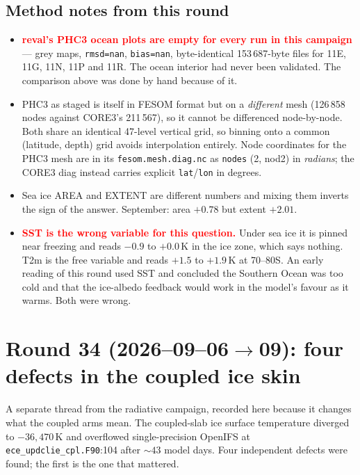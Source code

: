 \documentclass[10pt]{article}
\begin{document}
\subsection{Method notes from this round}\label{sub:r33method}

\begin{itemize}\itemsep1pt
\item \textcolor{red}{\textbf{reval's PHC3 ocean plots are empty for every run in this
campaign}} --- grey maps, \texttt{rmsd=nan}, \texttt{bias=nan}, byte-identical
153\,687-byte files for 11E, 11G, 11N, 11P and 11R. The ocean interior had never been
validated. The comparison above was done by hand because of it.
\item PHC3 as staged is itself in FESOM format but on a \emph{different} mesh (126\,858
nodes against CORE3's 211\,567), so it cannot be differenced node-by-node. Both share an
identical 47-level vertical grid, so binning onto a common (latitude, depth) grid avoids
interpolation entirely. Node coordinates for the PHC3 mesh are in its
\texttt{fesom.mesh.diag.nc} as \texttt{nodes} (2, nod2) in \emph{radians}; the CORE3 diag
instead carries explicit \texttt{lat}/\texttt{lon} in degrees.
\item Sea ice AREA and EXTENT are different numbers and mixing them inverts the sign of
the answer. September: area $+0.78$ but extent $+2.01$.
\item \textcolor{red}{\textbf{SST is the wrong variable for this question.}} Under sea ice
it is pinned near freezing and reads $-0.9$ to $+0.0$\,K in the ice zone, which says
nothing. T2m is the free variable and reads $+1.5$ to $+1.9$\,K at 70--80S. An early
reading of this round used SST and concluded the Southern Ocean was too cold and that the
ice-albedo feedback would work in the model's favour as it warms. Both were wrong.
\end{itemize}

\section{Round 34 (2026--09--06$\to$09): four defects in the coupled ice skin}\label{sec:round34}

A separate thread from the radiative campaign, recorded here because it changes what the
coupled arms mean. The coupled-slab ice surface temperature diverged to $-36{,}470$\,K and
overflowed single-precision OpenIFS at \texttt{ece\_updclie\_cpl.F90}:104 after ${\sim}43$
model days. Four independent defects were found; the first is the one that mattered.
\end{document}
